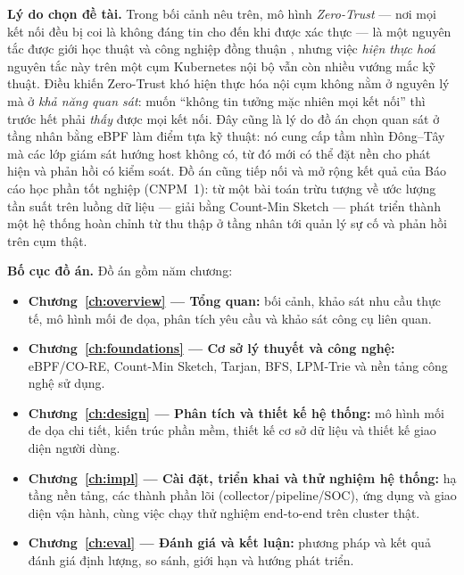 \textbf{Lý do chọn đề tài.} Trong bối cảnh nêu trên, mô hình \textit{Zero-Trust} --- nơi
mọi kết nối đều bị coi là không đáng tin cho đến khi được xác thực --- là một nguyên tắc
được giới học thuật và công nghiệp đồng thuận \cite{nist800207}, nhưng việc \textit{hiện
thực hoá} nguyên tắc này trên một cụm Kubernetes nội bộ vẫn còn nhiều vướng mắc kỹ thuật.
Điều khiến Zero-Trust khó hiện thực hóa nội cụm không nằm ở nguyên lý mà ở \emph{khả năng
quan sát}: muốn ``không tin tưởng mặc nhiên mọi kết nối'' thì trước hết phải \emph{thấy}
được mọi kết nối. Đây cũng là lý do đồ án chọn quan sát ở tầng nhân bằng eBPF làm điểm tựa
kỹ thuật: nó cung cấp tầm nhìn Đông--Tây mà các lớp giám sát hướng host không có, từ đó
mới có thể đặt nền cho phát hiện và phản hồi có kiểm soát. Đồ án cũng tiếp nối và mở rộng
kết quả của Báo cáo học phần tốt nghiệp (CNPM~1): từ một bài toán trừu tượng về ước lượng
tần suất trên luồng dữ liệu --- giải bằng Count-Min Sketch --- phát triển thành một hệ
thống hoàn chỉnh từ thu thập ở tầng nhân tới quản lý sự cố và phản hồi trên cụm thật.

\textbf{Bố cục đồ án.} Đồ án gồm năm chương:
\begin{itemize}
  \item \textbf{Chương~\ref{ch:overview} --- Tổng quan:} bối cảnh, khảo sát nhu cầu thực tế, mô hình mối đe dọa, phân tích yêu cầu và khảo sát công cụ liên quan.
  \item \textbf{Chương~\ref{ch:foundations} --- Cơ sở lý thuyết và công nghệ:} eBPF/CO-RE, Count-Min Sketch, Tarjan, BFS, LPM-Trie và nền tảng công nghệ sử dụng.
  \item \textbf{Chương~\ref{ch:design} --- Phân tích và thiết kế hệ thống:} mô hình mối đe dọa chi tiết, kiến trúc phần mềm, thiết kế cơ sở dữ liệu và thiết kế giao diện người dùng.
  \item \textbf{Chương~\ref{ch:impl} --- Cài đặt, triển khai và thử nghiệm hệ thống:} hạ tầng nền tảng, các thành phần lõi (collector/pipeline/SOC), ứng dụng và giao diện vận hành, cùng việc chạy thử nghiệm end-to-end trên cluster thật.
  \item \textbf{Chương~\ref{ch:eval} --- Đánh giá và kết luận:} phương pháp và kết quả đánh giá định lượng, so sánh, giới hạn và hướng phát triển.
\end{itemize}
